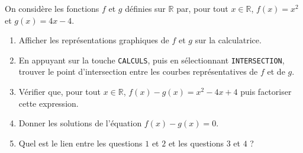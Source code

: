 \documentclass[11pt]{article}
\begin{document}
\begin{exo}
On considère les fonctions $f$ et $g$ définies sur $\mathbb{R}$ par, pour tout
$x\in\mathbb{R}$, $f(x)=x^2$ et $g(x) = 4x-4$.
\begin{enumerate}
  \item Afficher les représentations graphiques de $f$ et $g$ sur la
    calculatrice.
  \item En appuyant sur la touche \texttt{CALCULS}, puis en sélectionnant
    \texttt{INTERSECTION}, trouver le point d'intersection entre les courbes
    représentatives de $f$ et de $g$.
  \item Vérifier que, pour tout $x\in\mathbb{R}$, $f(x)-g(x)=x^2-4x+4$ puis
    factoriser cette expression.
  \item Donner les solutions de l'équation $f(x)-g(x)=0$.
  \item Quel est le lien entre les questions $1$ et $2$ et les questions $3$ et
    $4$ ?
\end{enumerate}
\end{exo}
\end{document}
